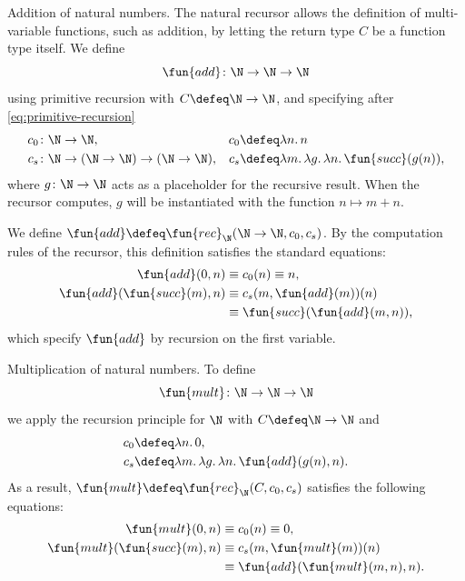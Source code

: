\begin{lpar}{Addition of natural numbers.}\label{lpar:natural-addition}
    The natural recursor allows the definition of multi-variable functions, such as addition, by letting the return type $C$ be a function type itself. We define
    \[
        \fun{add}\colon\N\to\N\to\N
    \]
    using primitive recursion with $C \defeq \N \to \N$, and specifying after \eqref{eq:primitive-recursion}
    \begin{align*}
        c_0\colon\N&\to\N,&c_0
            &\defeq\lambda n.\,n\\
        c_s\colon\N&\to(\N\to\N)\to(\N\to\N),
            &c_s&\defeq\lambda m.\,\lambda g.\,
                \lambda n.\,\fun{succ}(g(n)),
    \end{align*}
    where $g\colon\N\to\N$ acts as a placeholder for the recursive result. When the recursor computes, $g$ will be instantiated with the function $n\mapsto m+n$.
    
    We define $\fun{add}\defeq\fun{rec}_\N(\N\to\N,c_0,c_s)$. By the computation rules of the recursor, this definition satisfies the standard equations:
    \begin{align*}
        \fun{add}(0, n) &\equiv c_0(n) \equiv n,\\
        \fun{add}(\fun{succ}(m),n)&\equiv c_s(m,\fun{add}(m))(n)\\
        &\equiv \fun{succ}(\fun{add}(m, n)),
    \end{align*}
    which specify $\fun{add}$ by recursion on the first variable.
\end{lpar}

\begin{lpar}{Multiplication of natural numbers.}\label{lpar:natural-multiplication}
    To define
    \[
        \fun{mult}\colon\N\to\N\to\N
    \]
    we apply the recursion principle for $\N$ with $C\defeq\N\to\N$ and
    \begin{align*}
        c_0 &\defeq \lambda n.\, 0,\\
        c_s &\defeq \lambda m.\, \lambda g.\, \lambda n.\, \fun{add}(g(n), n).
    \end{align*}
    As a result, $\fun{mult}\defeq\fun{rec}_\N(C,c_0,c_s)$ satisfies the following equations:
    \begin{align*}
        \fun{mult}(0,n) &\equiv c_0(n) \equiv 0,\\
        \fun{mult}(\fun{succ}(m),n) &\equiv c_s(m,\fun{mult}(m))(n)\\
        &\equiv \fun{add}(\fun{mult}(m, n),n).
    \end{align*}    
\end{lpar}

